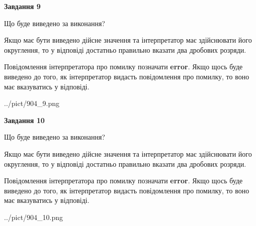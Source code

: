 \documentclass[12pt, ukrainian]{article}
\begin{document}
{\begin {Large}
{\begin {center}\textbf{Завдання 9}\end {center}}\par
Що буде виведено за виконання? \par

Якщо має бути виведено дійсне значення та інтерпретатор має здійснювати його округлення, 
то у відповіді достатньо правильно вказати два дробових розряди.

Повідомлення інтерпретатора про помилку позначати \textbf{error}.
Якщо щось буде виведено до того, як інтерпретатор видасть повідомлення про помилку, 
то воно має вказуватись у відповіді. \par

\begin{center}
	{../pict/904_9.png}
\end{center}
\newpage

{\begin {center}\textbf{Завдання 10}\end {center}}\par
Що буде виведено за виконання? \par

Якщо має бути виведено дійсне значення та інтерпретатор має здійснювати його округлення, 
то у відповіді достатньо правильно вказати два дробових розряди.

Повідомлення інтерпретатора про помилку позначати \textbf{error}.
Якщо щось буде виведено до того, як інтерпретатор видасть повідомлення про помилку, 
то воно має вказуватись у відповіді. \par

\begin{center}
	{../pict/904_10.png}
\end{center}
\newpage

\end {Large}}
\end{document}
